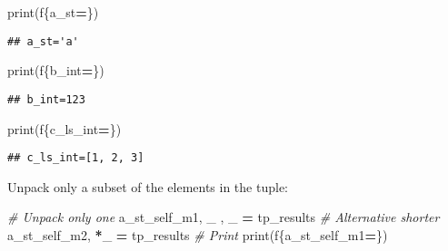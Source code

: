 \documentclass[
]{book}
\newenvironment{Shaded}{\begin{snugshade}}{\end{snugshade}}
\newcommand{\BuiltInTok}[1]{#1}
\newcommand{\CommentTok}[1]{\textcolor[rgb]{0.56,0.35,0.01}{\textit{#1}}}
\newcommand{\NormalTok}[1]{#1}
\newcommand{\OperatorTok}[1]{\textcolor[rgb]{0.81,0.36,0.00}{\textbf{#1}}}
\newcommand{\SpecialCharTok}[1]{\textcolor[rgb]{0.00,0.00,0.00}{#1}}
\newcommand{\SpecialStringTok}[1]{\textcolor[rgb]{0.31,0.60,0.02}{#1}}
\begin{document}
\begin{Shaded}
\begin{Highlighting}[]
\BuiltInTok{print}\NormalTok{(}\SpecialStringTok{f\textquotesingle{}}\SpecialCharTok{\{}\NormalTok{a\_st}\OperatorTok{=}\SpecialCharTok{\}}\SpecialStringTok{\textquotesingle{}}\NormalTok{)}
\end{Highlighting}
\end{Shaded}

\begin{verbatim}
## a_st='a'
\end{verbatim}

\begin{Shaded}
\begin{Highlighting}[]
\BuiltInTok{print}\NormalTok{(}\SpecialStringTok{f\textquotesingle{}}\SpecialCharTok{\{}\NormalTok{b\_int}\OperatorTok{=}\SpecialCharTok{\}}\SpecialStringTok{\textquotesingle{}}\NormalTok{)}
\end{Highlighting}
\end{Shaded}

\begin{verbatim}
## b_int=123
\end{verbatim}

\begin{Shaded}
\begin{Highlighting}[]
\BuiltInTok{print}\NormalTok{(}\SpecialStringTok{f\textquotesingle{}}\SpecialCharTok{\{}\NormalTok{c\_ls\_int}\OperatorTok{=}\SpecialCharTok{\}}\SpecialStringTok{\textquotesingle{}}\NormalTok{)}
\end{Highlighting}
\end{Shaded}

\begin{verbatim}
## c_ls_int=[1, 2, 3]
\end{verbatim}

Unpack only a subset of the elements in the tuple:

\begin{Shaded}
\begin{Highlighting}[]
\CommentTok{\# Unpack only one}
\NormalTok{a\_st\_self\_m1, \_ , \_ }\OperatorTok{=}\NormalTok{ tp\_results}
\CommentTok{\# Alternative shorter}
\NormalTok{a\_st\_self\_m2, }\OperatorTok{*}\NormalTok{\_  }\OperatorTok{=}\NormalTok{ tp\_results}
\CommentTok{\# Print}
\BuiltInTok{print}\NormalTok{(}\SpecialStringTok{f\textquotesingle{}}\SpecialCharTok{\{}\NormalTok{a\_st\_self\_m1}\OperatorTok{=}\SpecialCharTok{\}}\SpecialStringTok{\textquotesingle{}}\NormalTok{)}
\end{Highlighting}
\end{Shaded}
\end{document}

